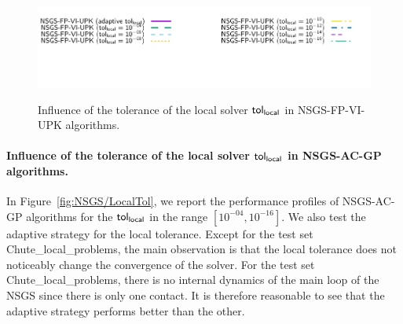 \begin{figure}
\\
{\includegraphics[width=\legendwidth]{figure/NSGS/LocalTol/VI/1.0e-08/50/time/profile-Chain_legend.pdf}} 
\caption{Influence of the tolerance of the local solver $\sf tol_{local}$ in {\sf NSGS-FP-VI-UPK} algorithms.}
 \label{fig:NSGS/LocalTol/VI}
\end{figure}

\paragraph{Influence of the tolerance of the local solver $\sf tol_{local}$ in {\sf NSGS-AC-GP} algorithms.}
In Figure~\ref{fig:NSGS/LocalTol},  we report the performance profiles of {\sf NSGS-AC-GP} algorithms for the $\sf tol_{local}$ in the range $[10^{-04}, 10^{-16}]$. We also test the  adaptive strategy for the local tolerance. Except for the test set Chute\_local\_problems,  the main observation is that the local tolerance does not noticeably change the convergence of the solver. For the test set Chute\_local\_problems, there is no internal dynamics of the main loop of the {\sf NSGS} since there is only one contact. It is therefore reasonable to see that the adaptive strategy performs better than the other.



